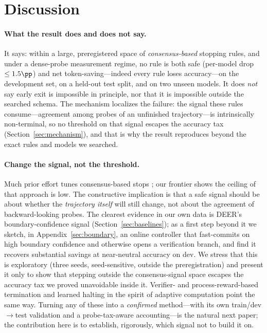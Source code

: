 \section{Discussion}
\label{sec:discussion}

\paragraph{What the result does and does not say.}
It says: within a large, preregistered space of \emph{consensus-based} stopping
rules, and under a dense-probe measurement regime, no rule is both safe
(per-model drop $\le1.5\pp$) and net token-saving---indeed every rule loses
accuracy---on the development set, on a held-out test split, and on two unseen
models. It does \emph{not} say early exit is impossible in principle, nor that it
is impossible outside the searched schema. The mechanism localizes the failure:
the signal these rules consume---agreement among probes of an unfinished
trajectory---is intrinsically non-terminal, so no threshold on that signal
escapes the accuracy tax (Section~\ref{sec:mechanism}), and that is why the
result reproduces beyond the exact rules and models we searched.

\paragraph{Change the signal, not the threshold.}
Much prior effort tunes consensus-based stops
\citep{dynasor_certaindex,aggarwal2023adaptive,li2024esc}; our frontier shows the
ceiling of that approach is low. The constructive implication is that a safe
signal should be about whether the \emph{trajectory itself} will still change,
not about the agreement of backward-looking probes. The clearest evidence in our
own data is DEER's boundary-confidence signal (Section~\ref{sec:baselines}); as a
first step beyond it we sketch, in Appendix~\ref{sec:boundary}, an online
controller that fast-commits on high boundary confidence and otherwise opens a
verification branch, and find it recovers substantial savings at near-neutral
accuracy on dev. We stress that this is exploratory (three seeds, seed-sensitive,
outside the preregistration) and present it only to show that stepping outside
the consensus-signal space escapes the accuracy tax we proved unavoidable inside
it. Verifier- and process-reward-based termination
\citep{lightman2024verify,wang2024mathshepherd} and learned halting in the spirit
of adaptive computation \citep{graves2016act,schuster2022confident} point the
same way. Turning any of these into a \emph{confirmed} method---with its own
train/dev$\rightarrow$test validation and a probe-tax-aware accounting---is the
natural next paper; the contribution here is to establish, rigorously, which
signal not to build it on.
